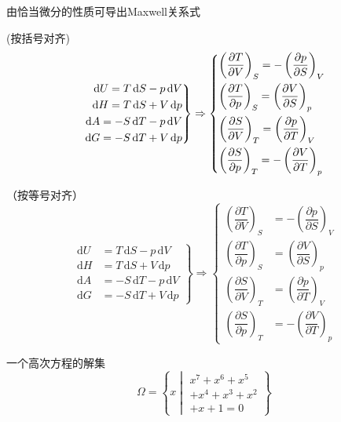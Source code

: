 \documentclass{article}
\newcommand{\di}{\,\mathrm{d}}
\newcommand{\partialratio}[3]{%
\left(\dfrac{\partial #1}{\partial #2}\right)_{#3}}
\newcommand{\set}[2]{%
\left\{#1 \middle\vert #2 \right\}}
\begin{document}
	由恰当微分的性质可导出Maxwell关系式

	\noindent (按括号对齐)
	\begin{equation}
		\left.
		\begin{rgathered}
			\di U = T \di S - p \di V \\
			\di H = T \di S + V \di p \\
			\di A = - S \di T - p \di V \\
			\di G = - S \di T + V \di p
		\end{rgathered}
		\right\} \Rightarrow \left\{
		\begin{lgathered}
			\partialratio{T}{V}{S} = - \partialratio{p}{S}{V} \\
			\partialratio{T}{p}{S} = \partialratio{V}{S}{p} \\
			\partialratio{S}{V}{T} = \partialratio{p}{T}{V} \\
			\partialratio{S}{p}{T} = - \partialratio{V}{T}{p}
		\end{lgathered}
		\right.
	\end{equation}

	\noindent （按等号对齐）
	\begin{equation}
		\left.
		\begin{aligned}
			\di U &= T \di S - p \di V \\
			\di H &= T \di S + V \di p \\
			\di A &= - S \di T - p \di V \\
			\di G &= - S \di T + V \di p
		\end{aligned}
		\right\} \Rightarrow \left\{
		\begin{aligned}
			\partialratio{T}{V}{S} &= - \partialratio{p}{S}{V} \\
			\partialratio{T}{p}{S} &= \partialratio{V}{S}{p} \\
			\partialratio{S}{V}{T} &= \partialratio{p}{T}{V} \\
			\partialratio{S}{p}{T} &= - \partialratio{V}{T}{p}
		\end{aligned}
		\right.
	\end{equation}

	\vspace{2cm}
	一个高次方程的解集
	\begin{equation}
		\Omega = \set{x}{\begin{multlined}
		x^7 + x^6 + x^5 \\ + x^4 + x^3 + x^2 \\ + x + 1 = 0
		\end{multlined}}
	\end{equation}
\end{document}
